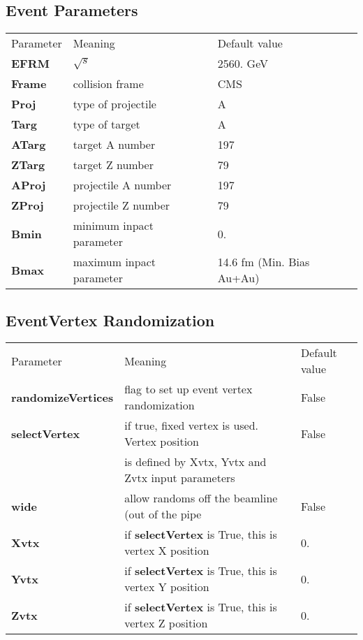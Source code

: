 \documentclass[11pt]{article}
\begin{document}
\subsection{Event Parameters}

\begin{tabular}{lll}
Parameter  & Meaning  & Default value \\
{\bf EFRM}  &  $\sqrt{s}$   &    2560. GeV \\
{\bf Frame} & collision frame  &     CMS \\
{\bf Proj}   & type of projectile  &   A \\
{\bf Targ} & type of target          &    A \\
{\bf ATarg}  & target A number     &           197  \\
{\bf ZTarg}  & target Z number       &   79  \\
{\bf AProj} & projectile A number     &           197 \\
{\bf ZProj}  & projectile Z number     &     79   \\
{\bf Bmin}  & minimum inpact parameter  &   0. \\
{\bf Bmax}  & maximum inpact parameter   &  14.6 fm (Min. Bias Au+Au) \\
\end{tabular}

\subsection{EventVertex Randomization}

\begin{tabular}{lll}
Parameter & Meaning & Default value \\
{\bf randomizeVertices} &  flag to set up event vertex randomization   &    False  \\
{\bf selectVertex} & if true, fixed vertex is used. Vertex position & False \\
                          & is defined by Xvtx, Yvtx and Zvtx input parameters &   \\
{\bf wide} & allow randoms off the beamline (out of the pipe &  False \\
{\bf Xvtx} & if {\bf selectVertex} is True, this is vertex X position  & 0. \\
{\bf Yvtx} & if {\bf selectVertex} is True, this is vertex Y position  &  0. \\
{\bf Zvtx} & if {\bf selectVertex} is True, this is vertex Z position  &  0.  \\
\end{tabular}
\end{document}
